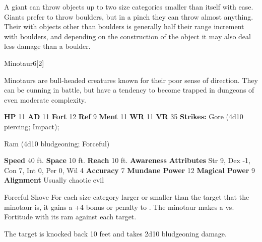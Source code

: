         A giant can throw objects up to two size categories smaller than itself with ease.
        Giants prefer to throw boulders, but in a pinch they can throw almost anything.
        Their  with objects other than boulders is generally half their range increment with boulders, and depending on the construction of the object it may also deal less damage than a boulder.
  
  
  \begin{monsection}{Minotaur}{6}[2]
    \vspace{-1em}\vspace{-1em}
    \vspace{0em}

    
      Minotaurs are bull-headed creatures known for their poor sense of direction.
      They can be cunning in battle, but have a tendency to become trapped in dungeons of even moderate complexity.
    
    

    \begin{spellcontent}
      \begin{spelltargetinginfo}
        \pari \textbf{HP} 11 \monsep
          \textbf{AD} 11 \monsep
          \textbf{Fort} 12 \monsep
          \textbf{Ref} 9 \monsep
          \textbf{Ment} 11
        \pari \textbf{WR} 11 \monsep
        \textbf{VR} 35
        \pari \textbf{Strikes:}
            Gore  (4d10 piercing; Impact);
\par Ram  (4d10 bludgeoning; Forceful)
      \end{spelltargetinginfo}
    \end{spellcontent}
    \begin{monsterfooter}
      \pari \textbf{Speed} 40 ft. \monsep
        \textbf{Space} 10 ft. \monsep
        \textbf{Reach} 10 ft.
      \pari \textbf{Awareness} 
      \pari \textbf{Attributes}
        Str 9, Dex -1,
        Con 7, Int 0,
        Per 0, Wil 4
      \pari \textbf{Accuracy} 7 \monsep
        \textbf{Mundane Power} 12 \monsep
      \textbf{Magical Power} 9
      \pari \textbf{Alignment} Usually chaotic evil
    \end{monsterfooter}
  \end{monsection}
  \begin{freeability}{Forceful Shove}
      For each size category larger or smaller than the target that the minotaur is, it gains a +4 bonus or penalty to . The minotaur makes a 
         vs. Fortitude
        with its ram against each target.
    
    \hit The target is knocked back 10 feet and takes 2d10 bludgeoning damage.
    \end{freeability}
  
